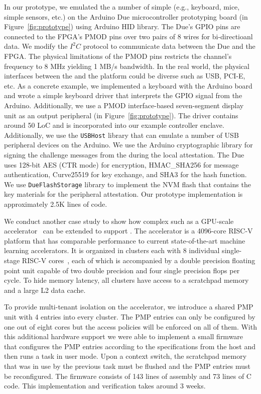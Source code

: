   In our prototype, we emulated the a number of simple \sphw (e.g., keyboard, mice, simple sensors, etc.) on the Arduino Due microcontroller prototyping board (\two in Figure~\ref{fig:prototype}) using Arduino HID library. The Due's GPIO pins are connected to the FPGA's PMOD pins over two pairs of $8$ wires for bi-directioanl data. We modify the $I^2C$ protocol to communicate data between the Due and the FPGA. The physical limitations of the PMOD pins restricts the channel's frequency to $8$ MHz yielding 1 MB/s bandwidth. In the real world, the physical interfaces between the \sphw and the platform could be diverse such as USB, PCI-E, etc. As a concrete example, we implemented a keyboard with the Arduino board and wrote a simple keyboard driver that interprets the GPIO signal from the Arduino. Additionally, we use a PMOD interface-based seven-segment display unit as an output peripheral (\three in Figure~\ref{fig:prototype}). The driver contains around 50 LoC and is incorporated into our example controller enclave. Additionally, we use the \texttt{USBHost} library that can emulate a number of USB peripheral devices on the Arduino. We use the Arduino cryptographic library for signing the challenge messages from the \ce during the local attestation. The Due uses 128-bit AES (CTR mode) for encryption, HMAC\_SHA256 for message authentication, Curve25519 for key exchange, and SHA3 for the hash function. We use \texttt{DueFlashStorage} library to implement the NVM flash that contains the key materials for the peripheral attestation. Our prototype implementation is approximately 2.5K lines of code.

 We conduct another case study to show how complex \sphw such as a GPU-scale accelerator~\cite{zaruba2020manticore} can be extended to support \name. The accelerator is a 4096-core RISC-V platform that has comparable performance to current state-of-the-art machine learning accelerators. It is organized in clusters each with 8 individual single-stage RISC-V cores~\cite{zaruba2020snitch}, each of which is accompanied by a double precision floating point unit capable of two double precision and four single precision flops per cycle. To hide memory latency, all clusters have access to a scratchpad memory and a large L2 data cache. 

To provide multi-tenant isolation on the accelerator, we introduce a shared PMP unit with 4 entries into every cluster. The PMP entries can only be configured by one out of eight cores but the access policies will be enforced on all of them. With this additional hardware support we were able to implement a small firmware that configures the PMP entries according to the specifications from the host and then runs a task in user mode. Upon a context switch, the scratchpad memory that was in use by the previous task must be flushed and the PMP entries must be reconfigured. The firmware consists of 143 lines of assembly and 73 lines of C code. This implementation and verification takes around 3 weeks.

